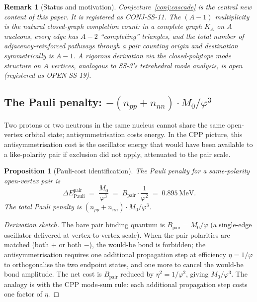\documentclass[11pt,letterpaper]{article}
\newtheorem{proposition}[theorem]{Proposition}
\newtheorem{remark}[theorem]{Remark}
\newcommand{\phig}{\varphi}
\newcommand{\Mzero}{M_0}
\newcommand{\Bpair}{B_{\mathrm{pair}}}
\newcommand{\npp}{n_{pp}}
\newcommand{\nnn}{n_{nn}}
\begin{document}
\begin{remark}[Status and motivation]
\label{rem:cascade_status}
Conjecture~\ref{conj:cascade} is the central new content of this paper. It is registered as CONJ-SS-11. The $(A-1)$ multiplicity is the natural closed-graph completion count: in a complete graph $K_A$ on $A$ nucleons, every edge has $A-2$ ``completing'' triangles, and the total number of adjacency-reinforced pathways through a pair counting origin and destination symmetrically is $A-1$. A rigorous derivation via the closed-polytope mode structure on $A$ vertices, analogous to SS-3's tetrahedral mode analysis, is open (registered as OPEN-SS-19).
\end{remark}

\subsection{The Pauli penalty: $-(\npp+\nnn) \cdot \Mzero/\phig^{3}$}
\label{sec:pauli_derivation}

Two protons or two neutrons in the same nucleus cannot share the same open-vertex orbital state; antisymmetrisation costs energy. In the CPP picture, this antisymmetrisation cost is the oscillator energy that would have been available to a like-polarity pair if exclusion did not apply, attenuated to the pair scale.

\begin{proposition}[Pauli-cost identification]
\label{prop:pauli_cost}
The Pauli penalty for a same-polarity open-vertex pair is
\begin{equation}
\Delta E_{\mathrm{Pauli}}^{\mathrm{pair}} \;=\; \frac{\Mzero}{\phig^{3}} \;=\; \Bpair \cdot \frac{1}{\phig^{2}} \;=\; 0.895~\mathrm{MeV}.
\label{eq:pauli_pair}
\end{equation}
The total Pauli penalty is $(\npp + \nnn) \cdot \Mzero/\phig^{3}$.
\end{proposition}

\begin{proof}[Derivation sketch]
The bare pair binding quantum is $\Bpair = \Mzero/\phig$ (a single-edge oscillator delivered at vertex-to-vertex scale). When the pair polarities are matched (both $+$ or both $-$), the would-be bond is forbidden; the antisymmetrisation requires one additional propagation step at efficiency $\eta = 1/\phig$ to orthogonalise the two endpoint states, and one more to cancel the would-be bond amplitude. The net cost is $\Bpair$ reduced by $\eta^2 = 1/\phig^2$, giving $\Mzero/\phig^3$. The analogy is with the CPP mode-sum rule: each additional propagation step costs one factor of $\eta$.
\end{proof}
\end{document}
